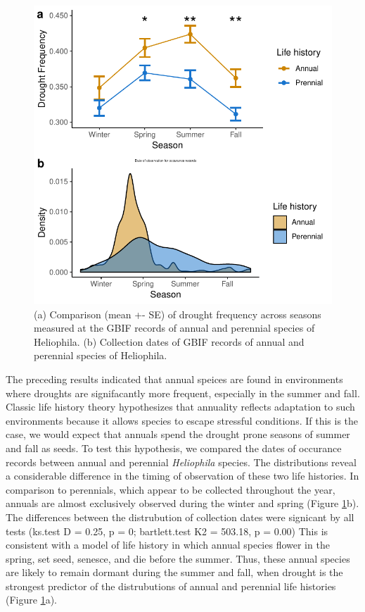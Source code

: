 \documentclass[man,floatsintext]{apa6}
\theoremstyle{definition}
\theoremstyle{definition}
\theoremstyle{definition}
\theoremstyle{remark}
\begin{document}
\begin{figure}
\centering
\includegraphics{../figures/line_and_dates.pdf}
\caption{\label{fig:lineplots}(a) Comparison (mean +- SE) of drought frequency across
seasons measured at the GBIF records of annual and perennial species of
Heliophila. (b) Collection dates of GBIF records of annual and perennial
species of Heliophila.}
\end{figure}

The preceding results indicated that annual speices are found in
environments where droughts are signifacantly more frequent, especially
in the summer and fall. Classic life history theory hypothesizes that
annuality reflects adaptation to such environments because it allows
species to escape stressful conditions. If this is the case, we would
expect that annuals spend the drought prone seasons of summer and fall
as seeds. To test this hypothesis, we compared the dates of occurance
records between annual and perennial \emph{Heliophila} species. The
distributions reveal a considerable difference in the timing of
observation of these two life histories. In comparison to perennials,
which appear to be collected throughout the year, annuals are almost
exclusively observed during the winter and spring (Figure
\ref{fig:lineplots}b). The differences between the distrubution of
collection dates were signicant by all tests (ks.test D = 0.25, p = 0;
bartlett.test K2 = 503.18, p = 0.00) This is consistent with a model of
life history in which annual species flower in the spring, set seed,
senesce, and die before the summer. Thus, these annual species are
likely to remain dormant during the summer and fall, when drought is the
strongest predictor of the distrubutions of annual and perennial life
histories (Figure \ref{fig:lineplots}a).
\end{document}
